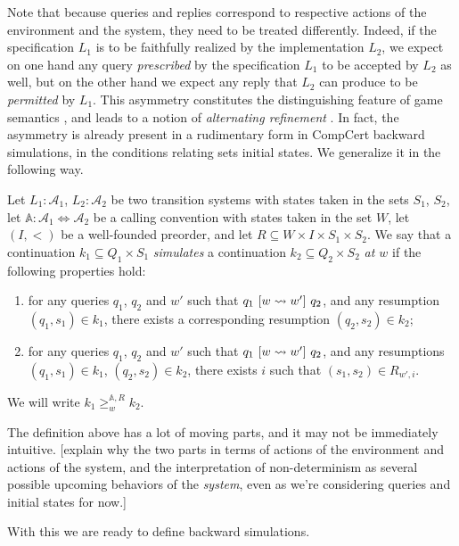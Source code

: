 Note that because queries and replies
correspond to respective actions of the environment and the system,
they need to be treated differently.
Indeed,
if the specification $L_1$ is to be faithfully realized
by the implementation $L_2$,
we expect on one hand
any query \emph{prescribed} by the specification $L_1$
to be accepted by $L_2$ as well,
but on the other hand
we expect any reply that $L_2$ can produce
to be \emph{permitted} by $L_1$.
This asymmetry constitutes the distinguishing feature
of game semantics \cite{cspgs},
and leads to a notion of \emph{alternating refinement} \cite{altref}.
In fact,
the asymmetry is already present in a rudimentary form
in CompCert backward simulations,
in the conditions relating sets initial states.
We generalize it in the following way.

\begin{definition}
Let $L_1 : \mathcal{A}_1$, $L_2 : \mathcal{A}_2$
be two transition systems with states taken in the sets $S_1$, $S_2$,
let $\mathbb{A} : \mathcal{A}_1 \Leftrightarrow \mathcal{A}_2$
be a calling convention with states taken in the set $W$,
let $(I, <)$ be a well-founded preorder, and
let $R \subseteq W \times I \times S_1 \times S_2$.
We say that
a continuation $k_1 \subseteq Q_1 \times S_1$
\emph{simulates}
a continuation $k_2 \subseteq Q_2 \times S_2$
\emph{at $w$}
if the following properties hold:
\begin{enumerate}
\item
  for any queries $q_1$, $q_2$ and $w'$ such that
  $q_1 \ [{w \leadsto w'}]\  q_2$,
  and any resumption $(q_1, s_1) \in k_1$,
  there exists a corresponding resumption $(q_2, s_2) \in k_2$;
\item
  for any queries $q_1$, $q_2$ and $w'$ such that
  $q_1 \ [{w \leadsto w'}]\  q_2$,
  and any resumptions $(q_1, s_1) \in k_1$, $(q_2, s_2) \in k_2$,
  there exists $i$ such that $(s_1, s_2) \in R_{w',i}$.
\end{enumerate}
We will write $k_1 \ge^{\mathbb{A},R}_w k_2$.
\end{definition}

The definition above has a lot of moving parts, and
it may not be immediately intuitive.
[explain why the two parts in terms of
actions of the environment and actions of the system,
and the interpretation of non-determinism as
several possible upcoming behaviors of the \emph{system},
even as we're considering queries and initial states for now.]

With this we are ready to define backward simulations.

